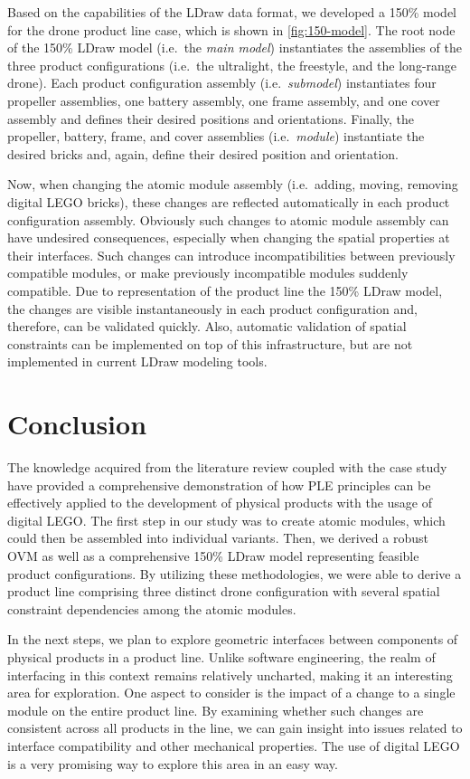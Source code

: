 \documentclass[sigconf,review]{acmart}
\begin{document}
Based on the capabilities of the LDraw data format, we developed a 150\% model for the drone product line case, which is shown in \cref{fig:150-model}.
The root node of the 150\% LDraw model (i.e.\ the \textit{main model}) instantiates the assemblies of the three product configurations (i.e.\ the ultralight, the freestyle, and the long-range drone).
Each product configuration assembly (i.e.\ \textit{submodel}) instantiates four propeller assemblies, one battery assembly, one frame assembly, and one cover assembly and defines their desired positions and orientations.
Finally, the propeller, battery, frame, and cover assemblies (i.e.\ \textit{module}) instantiate the desired bricks and, again, define their desired position and orientation.

Now, when changing the atomic module assembly (i.e.\ adding, moving, removing digital LEGO bricks), these changes are reflected automatically in each product configuration assembly.
Obviously such changes to atomic module assembly can have undesired consequences, especially when changing the spatial properties at their interfaces.
Such changes can introduce incompatibilities between previously compatible modules, or make previously incompatible modules suddenly compatible.
Due to representation of the product line the 150\% LDraw model, the changes are visible instantaneously in each product configuration and, therefore, can be validated quickly.
Also, automatic validation of spatial constraints can be implemented on top of this infrastructure, but are not implemented in current LDraw modeling tools.

\section{Conclusion}
\label{sec:conclusion}

The knowledge acquired from the literature review coupled with the case study have provided a comprehensive demonstration of how PLE principles can be effectively applied to the development of physical products with the usage of digital LEGO. 
The first step in our study was to create atomic modules, which could then be assembled into individual variants. 
Then, we derived a robust OVM as well as a comprehensive 150\% LDraw model representing feasible product configurations. 
By utilizing these methodologies, we were able to derive a product line comprising three distinct drone configuration with several spatial constraint dependencies among the atomic modules.

In the next steps, we plan to explore geometric interfaces between components of physical products in a product line. Unlike software engineering, the realm of interfacing in this context remains relatively uncharted, making it an interesting area for exploration. 
One aspect to consider is the impact of a change to a single module on the entire product line. 
By examining whether such changes are consistent across all products in the line, we can gain insight into issues related to interface compatibility and other mechanical properties. 
The use of digital LEGO is a very promising way to explore this area in an easy way.
\end{document}
